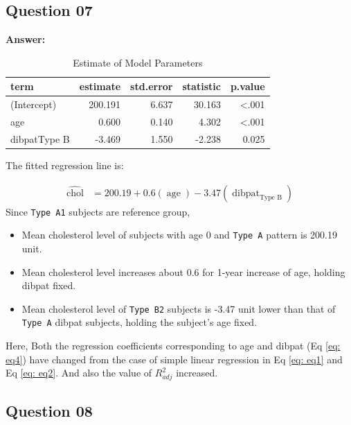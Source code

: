 \documentclass[
  12pt,
  oneside]{article}
\providecommand{\tightlist}{%
  \setlength{\itemsep}{0pt}\setlength{\parskip}{0pt}}
\begin{document}
\hypertarget{question-07}{%
\subsection{Question 07}\label{question-07}}

\textbf{Answer:}

\begin{table}[H]

\caption{\label{tab:Table-09}Estimate of Model Parameters}
\centering
\begin{tabular}[t]{lrrrr}
\toprule
term & estimate & std.error & statistic & p.value\\
\midrule
(Intercept) & 200.191 & 6.637 & 30.163 & <.001\\
age & 0.600 & 0.140 & 4.302 & <.001\\
dibpatType B & -3.469 & 1.550 & -2.238 & 0.025\\
\bottomrule
\end{tabular}
\end{table}

The fitted regression line is:

\begin{equation}
\label{eq: eq4}
\begin{aligned}
\operatorname{\widehat{chol}} &= 200.19 + 0.6(\operatorname{age}) - 3.47(\operatorname{dibpat}_{\operatorname{Type\ B}})
\end{aligned}
\end{equation}
Since \texttt{Type\ A1} subjects are reference group,

\begin{itemize}
\tightlist
\item
  Mean cholesterol level of subjects with age 0 and \texttt{Type\ A} pattern is 200.19 unit.
\item
  Mean cholesterol level increases about 0.6 for 1-year increase of age, holding dibpat fixed.
\item
  Mean cholesterol level of \texttt{Type\ B2} subjects is -3.47 unit lower than that of \texttt{Type\ A} dibpat subjects, holding the subject's age fixed.
\end{itemize}

Here, Both the regression coefficients corresponding to age and dibpat (Eq \ref{eq: eq4}) have changed from the case of simple linear regression in Eq \ref{eq: eq1} and Eq \ref{eq: eq2}. And also the value of \(R^2_{adj}\) increased.

\hypertarget{question-08}{%
\subsection{Question 08}\label{question-08}}
\end{document}
